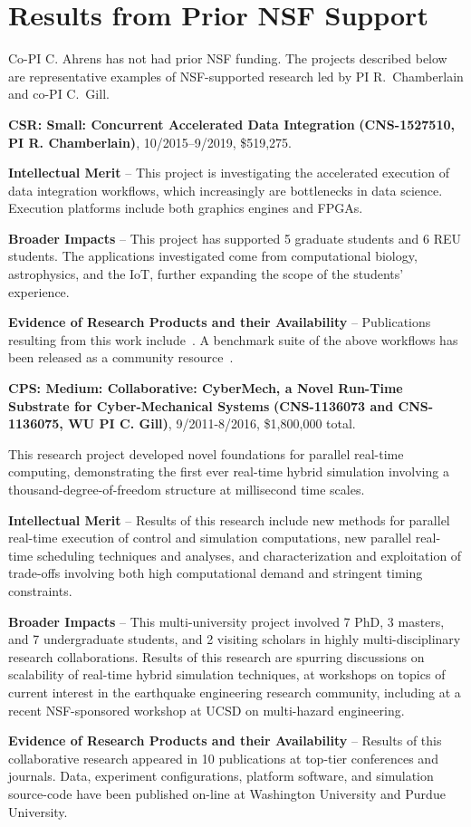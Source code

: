\section{Results from Prior NSF Support}
\label{sec:prior}

Co-PI C. Ahrens has not had prior NSF funding. The projects described
below are representative examples of NSF-supported research led by PI 
R.~Chamberlain and co-PI C.~Gill.

\noindent
{\large\bf CSR: Small: Concurrent Accelerated Data Integration}
{\bf (CNS-1527510,
PI R. Chamberlain)}, 
10/2015--9/2019, \$519,275.  

\textbf{Intellectual Merit} -- This project is investigating the
accelerated execution of data integration workflows, which
increasingly are bottlenecks in data science. Execution platforms
include both graphics engines and FPGAs.

\textbf{Broader Impacts} -- This project has supported 5
graduate students and 6 REU students.  The applications investigated
come from computational biology, astrophysics, and the IoT,
further expanding the scope of the students'
experience.

\textbf{Evidence of Research Products and their Availability} --
Publications resulting from this work include~\cite{cc19,dibs,c17,fcbmc19,mgc16,js16}.
A benchmark suite of the above workflows has been released
as a community resource~\cite{dibsv1}.

\noindent
{\large\bf CPS: Medium: Collaborative: CyberMech, a Novel Run-Time Substrate for 
Cyber-Mechanical Systems}
{\bf (CNS-1136073 and CNS-1136075,
WU PI C. Gill)}, 9/2011-8/2016, \$1,800,000 total.  

This research project developed novel foundations for parallel real-time computing, demonstrating the first ever real-time hybrid simulation involving a thousand-degree-of-freedom structure at millisecond time scales.

\textbf{Intellectual Merit} -- Results of this research include new methods for parallel real-time execution of control and simulation computations, new parallel real-time scheduling techniques and analyses, and characterization and exploitation of trade-offs involving both high computational demand and stringent timing constraints.

\textbf{Broader Impacts} -- This multi-university project involved 7 PhD, 3 masters, and 7 undergraduate students, and 2 visiting scholars in highly multi-disciplinary research collaborations.  Results of this research are spurring discussions on scalability of real-time hybrid simulation techniques, at workshops on topics of current interest in the earthquake engineering research community, including at a recent NSF-sponsored workshop at UCSD on multi-hazard engineering.

\textbf{Evidence of Research Products and their Availability} -- Results of this 
collaborative research appeared in 10 publications at top-tier conferences and journals.
Data, experiment configurations, platform software, and simulation source-code 
have been published on-line at Washington University and Purdue University.

